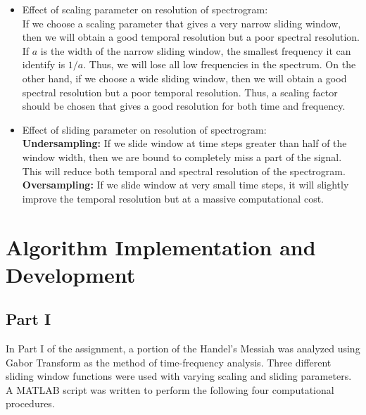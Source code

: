 \documentclass{article}
\begin{document}
\begin{itemize}
\item Effect of scaling parameter on resolution of spectrogram: \\
If we choose a scaling parameter that gives a very narrow sliding window, then we will obtain a good temporal resolution but a poor spectral resolution. If $a$ is the width of the narrow sliding window, the smallest frequency it can identify is $1/a$. Thus, we will lose all low frequencies in the spectrum. On the other hand, if we choose a wide sliding window, then we will obtain a good spectral resolution but a poor temporal resolution. Thus, a scaling factor should be chosen that gives a good resolution for both time and frequency. 

\item Effect of sliding parameter on resolution of spectrogram: \\
\textbf{Undersampling:} If we slide window at time steps greater than half of the window width, then we are bound to completely miss a part of the signal. This will reduce both temporal and spectral resolution of the spectrogram. \\
\textbf{Oversampling:} If we slide window at very small time steps, it will slightly improve the temporal resolution but at a massive computational cost.
\end{itemize}


\section{Algorithm Implementation and Development}\label{Algorithm}
\subsection{Part I}
In Part I of the assignment, a portion of the Handel's Messiah was analyzed using Gabor Transform as the method of time-frequency analysis. Three different sliding window functions were used with varying scaling and sliding parameters. A MATLAB script was written to perform the following four computational procedures.
\end{document}
